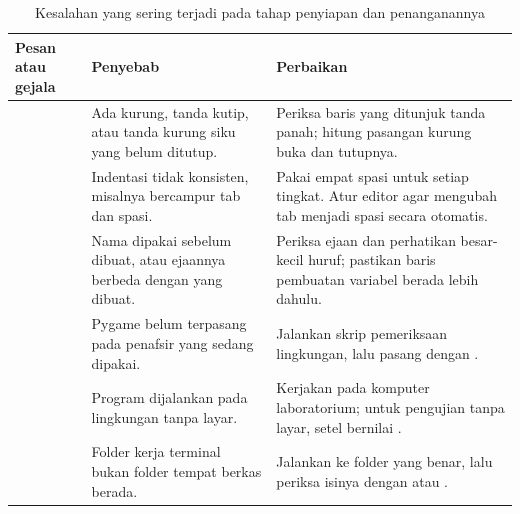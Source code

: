 \begin{table}[htbp]
\centering
\caption{Kesalahan yang sering terjadi pada tahap penyiapan dan penanganannya}
\label{tab:galat-umum}
{\setlength{\tabcolsep}{4pt}\footnotesize%
\begin{tabularx}{\textwidth}{@{}L{4.4cm} L{4.0cm} Y@{}}
\toprule
\headrow \textbf{Pesan atau gejala} & \textbf{Penyebab} & \textbf{Perbaikan} \\
\midrule
{} &
Ada kurung, tanda kutip, atau tanda kurung siku yang belum ditutup. &
Periksa baris yang ditunjuk tanda panah; hitung pasangan kurung buka dan
tutupnya. \\
\addlinespace
{} &
Indentasi tidak konsisten, misalnya bercampur tab dan spasi. &
Pakai empat spasi untuk setiap tingkat. Atur editor agar mengubah tab menjadi
spasi secara otomatis. \\
\addlinespace
{} &
Nama dipakai sebelum dibuat, atau ejaannya berbeda dengan yang dibuat. &
Periksa ejaan dan perhatikan besar-kecil huruf; pastikan baris pembuatan
variabel berada lebih dahulu. \\
\addlinespace
{} &
Pygame belum terpasang pada penafsir yang sedang dipakai. &
Jalankan skrip pemeriksaan lingkungan, lalu pasang dengan
. \\
\addlinespace
{} &
Program dijalankan pada lingkungan tanpa layar. &
Kerjakan pada komputer laboratorium; untuk pengujian tanpa layar, setel
 bernilai . \\
\addlinespace
{} &
Folder kerja terminal bukan folder tempat berkas berada. &
Jalankan  ke folder yang benar, lalu periksa isinya dengan 
atau . \\
\bottomrule
\end{tabularx}}
\end{table}
